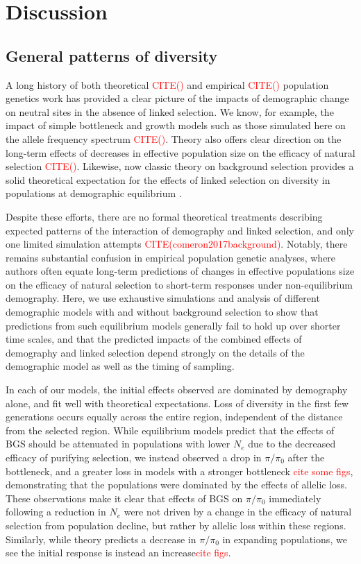 \documentclass[9pt,twocolumn,twoside]{rilabRxiv}
\newcommand{\jri}[1]{{\small \textcolor{red}{#1}}}
\newcommand{\citex}[1]{{\small \textcolor{red}{CITE(#1)}}}
\begin{document}
\section{Discussion}

\subsection{General patterns of diversity}

A long history of both theoretical \citex{} and empirical \citex{} population genetics work has provided a clear picture of the impacts of demographic change on neutral sites in the absence of linked selection.
We know, for example, the impact of simple bottleneck and growth models such as those simulated here on the allele frequency spectrum \citex{}.
Theory also offers clear direction on the long-term effects of decreases in effective population size on the efficacy of natural selection \citex{}.
Likewise, now classic theory on background selection provides a solid theoretical expectation for the effects of linked selection on diversity in populations at demographic equilibrium \citep{nordborg1996effect}.

Despite these efforts, there are no formal theoretical treatments describing expected patterns of the interaction of demography and linked selection, and only one limited simulation attempts \citex{comeron2017background}.
Notably, there remains substantial confusion in empirical population genetic analyses, where authors often equate long-term predictions of changes in effective populations size on the efficacy of natural selection to short-term responses under non-equilibrium demography.
Here, we use exhaustive simulations and analysis of different demographic models with and without background selection to show that predictions from such equilibrium models generally fail to hold up over shorter time scales, and that the predicted impacts of the combined effects of demography and linked selection depend strongly on the details of the demographic model as well as the timing of sampling.

In each of our models, the initial effects observed are dominated by demography alone, and fit well with theoretical expectations.
Loss of diversity in the first few generations occurs equally across the entire region, independent of the distance from the selected region.
While equilibrium models predict that the effects of BGS should be attenuated in populations with lower $N_e$ due to the decreased efficacy of purifying selection, we instead observed a drop in $\pi/\pi_0$  after the bottleneck, and a greater loss in models with a stronger bottleneck \jri{cite some figs}, demonstrating that the populations were dominated by the effects of allelic loss.
These observations make it clear that effects of BGS on $\pi/\pi_0$ immediately following a reduction in $N_e$ were not driven by a change in the efficacy of natural selection from population decline, but rather by allelic loss within these regions.
Similarly, while theory predicts a decrease in $\pi/\pi_0$ in expanding populations, we see the initial response is instead an increase\jri{cite figs}.
\end{document}

